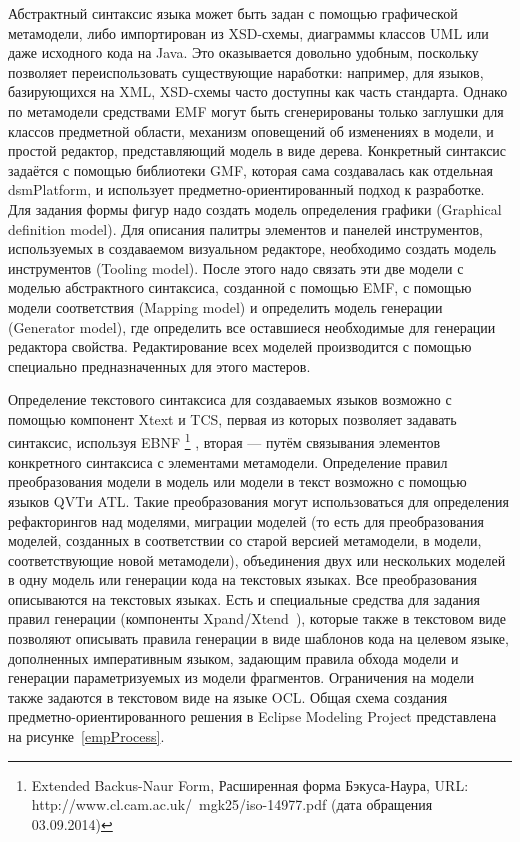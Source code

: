 Абстрактный синтаксис языка может быть задан с помощью графической метамодели, либо 
импортирован из XSD-схемы, диаграммы классов UML или даже исходного кода на Java. 
Это оказывается довольно удобным, поскольку позволяет переиспользовать существующие 
наработки: например, для языков, базирующихся на XML, XSD-схемы часто доступны как 
часть стандарта. Однако по метамодели средствами EMF могут быть сгенерированы только 
заглушки для классов предметной области, механизм оповещений об изменениях в модели, 
и простой редактор, представляющий модель в виде дерева. Конкретный синтаксис задаётся
с помощью библиотеки GMF, которая сама создавалась как отдельная \ac{dsmPlatform}, и использует 
предметно-ориентированный подход к разработке. Для задания формы фигур надо создать 
модель определения графики (Graphical definition model). Для описания палитры элементов 
и панелей инструментов, используемых в создаваемом визуальном редакторе, необходимо 
создать модель инструментов (Tooling model). После этого надо связать эти две модели 
с моделью абстрактного синтаксиса, созданной с помощью EMF, с помощью модели соответствия 
(Mapping model) и определить модель генерации (Generator model), где определить все 
оставшиеся необходимые для генерации редактора свойства. Редактирование всех моделей 
производится с помощью специально предназначенных для этого мастеров.

Определение текстового синтаксиса для создаваемых языков возможно с помощью компонент 
Xtext и TCS, первая из которых позволяет задавать синтаксис, используя EBNF%
\footnote{Extended Backus-Naur Form, Расширенная форма Бэкуса-Наура, URL: http://www.cl.cam.ac.uk/~mgk25/iso-14977.pdf (дата обращения 03.09.2014)}%
, вторая --- путём связывания элементов конкретного синтаксиса с элементами метамодели. Определение 
правил преобразования модели в модель или модели в текст возможно с помощью языков 
QVTи ATL. Такие преобразования могут использоваться для определения рефакторингов 
над моделями, миграции моделей (то есть для преобразования моделей, созданных в соответствии 
со старой версией метамодели, в модели, соответствующие новой метамодели), объединения 
двух или нескольких моделей в одну модель или генерации кода на текстовых языках. 
Все преобразования описываются на текстовых языках. Есть и специальные средства для задания правил генерации 
(компоненты Xpand/Xtend~\cite{xpand}), которые также в текстовом виде позволяют описывать 
правила генерации в виде шаблонов кода на целевом языке, дополненных императивным языком, задающим 
правила обхода модели и генерации параметризуемых из модели фрагментов. Ограничения на модели 
также задаются в текстовом виде на языке OCL. Общая схема создания предметно-ориентированного 
решения в Eclipse Modeling Project представлена на рисунке~\ref{empProcess}.

